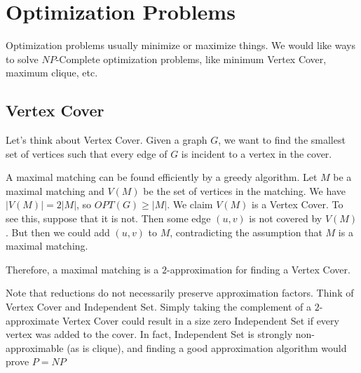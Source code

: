 




\section*{Optimization Problems}

Optimization problems usually minimize or maximize things.  We would like ways to solve $NP$-Complete optimization problems, like minimum Vertex Cover, maximum clique, etc.



\subsection*{Vertex Cover}
Let's think about Vertex Cover.  Given a graph $G$, we want to find the smallest set of vertices such that every edge of $G$ is incident to a vertex in the cover.  


A maximal matching can be found efficiently by a greedy algorithm.  Let $M$ be a maximal matching and $V(M)$ be the set of vertices in the matching.  We have $|V(M)|=2|M|$, so $OPT(G)\geq |M|$.  We claim $V(M)$ is a Vertex Cover.  To see this, suppose that it is not.  Then some edge $(u,v)$ is not covered by $V(M)$.  But then we could add $(u,v)$ to $M$, contradicting the assumption that $M$ is a maximal matching.

Therefore, a maximal matching is a $2$-approximation for finding a Vertex Cover.

Note that reductions do not necessarily preserve approximation factors.  Think of Vertex Cover and Independent Set.  Simply taking the complement of a $2$-approximate Vertex Cover could result in a size zero Independent Set if every vertex was added to the cover.  In fact, Independent Set is strongly non-approximable (as is clique), and finding a good approximation algorithm would prove $P=NP$

